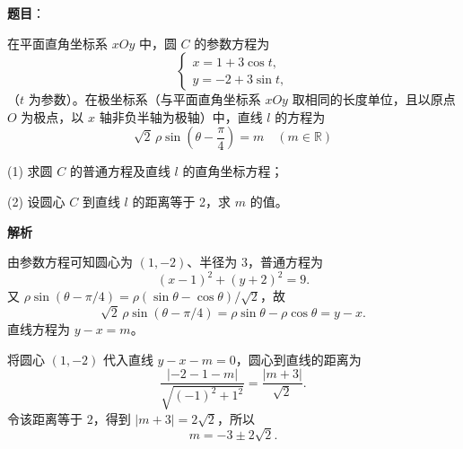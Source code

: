 \begin{answer}

\textbf{题目}：

在平面直角坐标系 $xOy$ 中，圆 $C$ 的参数方程为
\nopagebreak[4]
\[
\begin{cases}
x=1+3\cos t,\\
y=-2+3\sin t,
\end{cases}
\]
（$t$ 为参数）。在极坐标系（与平面直角坐标系 $xOy$ 取相同的长度单位，且以原点 $O$ 为极点，以 $x$ 轴非负半轴为极轴）中，直线 $l$ 的方程为
\nopagebreak[4]
\[
\sqrt2\,\rho\sin\!\left(\theta-\dfrac\pi4\right)=m\quad(m\in\mathbb{R})
\]

(1) 求圆 $C$ 的普通方程及直线 $l$ 的直角坐标方程；

(2) 设圆心 $C$ 到直线 $l$ 的距离等于 2，求 $m$ 的值。

\textbf{解析}


由参数方程可知圆心为 $(1,-2)$、半径为 $3$，普通方程为
\nopagebreak[4]
\[
(x-1)^2+(y+2)^2=9.
\]
又 $\rho\sin(\theta-\pi/4)=\rho(\sin\theta-\cos\theta)/\sqrt2$，故
\nopagebreak[4]
\[
\sqrt2\,\rho\sin(\theta-\pi/4)=\rho\sin\theta-\rho\cos\theta=y-x.
\]
直线方程为 $y-x=m$。


将圆心 $(1,-2)$ 代入直线 $y-x-m=0$，圆心到直线的距离为
\nopagebreak[4]
\[
\frac{|{-2}-1-m|}{\sqrt{(-1)^2+1^2}}
=\frac{|m+3|}{\sqrt2}.
\]
令该距离等于 $2$，得到 $|m+3|=2\sqrt2$，所以
\nopagebreak[4]
\[
m=-3\pm2\sqrt2.
\]



\end{answer}
